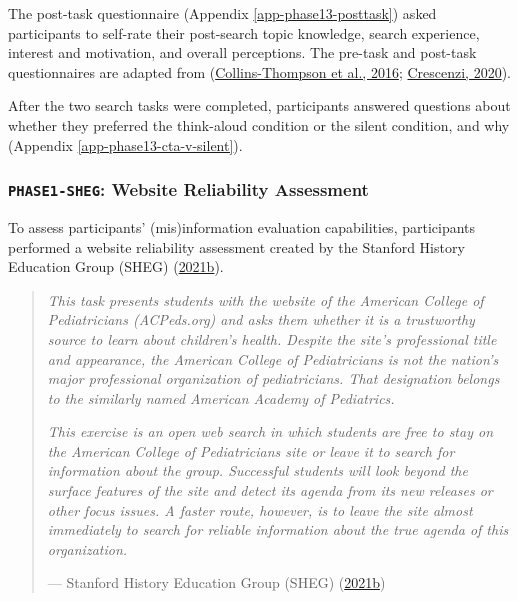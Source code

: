 \documentclass[letterpaper, nobind]{templates/ociamthesis}
\begin{document}
The post-task questionnaire (Appendix \ref{app-phase13-posttask}) asked participants to self-rate their post-search topic knowledge, search experience, interest and motivation, and overall perceptions.
The pre-task and post-task questionnaires are adapted from (\protect\hyperlink{ref-collins2016assessing}{Collins-Thompson et al., 2016}; \protect\hyperlink{ref-crescenzi2020adaptation}{Crescenzi, 2020}).

After the two search tasks were completed, participants answered questions about whether they preferred the think-aloud condition or the silent condition, and why (Appendix \ref{app-phase13-cta-v-silent}).

\hypertarget{phase1-sheg-website-reliability-assessment}{%
\subsubsection{\texorpdfstring{\texttt{PHASE1-SHEG}: Website Reliability Assessment}{PHASE1-SHEG: Website Reliability Assessment}}\label{phase1-sheg-website-reliability-assessment}}

To assess participants' (mis)information evaluation capabilities, participants performed a website reliability assessment created by the Stanford History Education Group (SHEG) (\protect\hyperlink{ref-sheg2021website-reliability}{2021b}).

\begin{quote}
\emph{This task presents students with the website of the American College of Pediatricians (ACPeds.org) and asks them whether it is a trustworthy source to learn about children's health. Despite the site's professional title and appearance, the American College of Pediatricians is not the nation's major professional organization of pediatricians. That designation belongs to the similarly named American Academy of Pediatrics.}

\emph{This exercise is an open web search in which students are free to stay on the American College of Pediatricians site or leave it to search for information about the group. Successful students will look beyond the surface features of the site and detect its agenda from its new releases or other focus issues. A faster route, however, is to leave the site almost immediately to search for reliable information about the true agenda of this organization.}

\hfill --- Stanford History Education Group (SHEG) (\protect\hyperlink{ref-sheg2021website-reliability}{2021b})
\end{quote}
\end{document}
